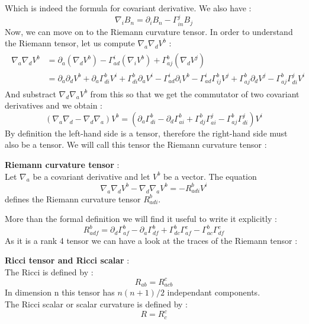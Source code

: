 \documentclass[a4paper,12pt]{article}
\theoremstyle{definition}
\begin{document}
Which is indeed the formula for covariant derivative.
We also have :
\begin{equation}
	\nabla_iB_n=\partial_iB_n-\Gamma^j_{in}B_j
\end{equation}
Now, we can move on to the Riemann curvature tensor.
In order to understand the Riemann tensor, let us compute $\nabla _a \nabla _d V^b$ :
\begin{align}
\begin{split}
	\nabla _a \nabla _d V^b &= \partial_a(\nabla _d V^b)-\Gamma^i_{ad} (\nabla _i V^b)+\Gamma^b_{aj} (\nabla _d V^j)\\
	&=\partial_a\partial_d V^b+ \partial_a \Gamma^b_{di}V^i+ \Gamma^b_{di}\partial_a V^i - \Gamma^i_{ad}\partial_i V^b
	-\Gamma^i_{ad}\Gamma^b_{ij}V^j+\Gamma^b_{aj}\partial_d V^j-\Gamma^b_{aj}\Gamma^j_{di}V^i
\end{split}
\end{align}
And substract $\nabla _d \nabla _a V^b$ from this so that we get the commutator of two covariant derivatives and we obtain :
\begin{equation}
	(\nabla _a \nabla _d - \nabla _d \nabla _a)V^b=(\partial_a \Gamma^b_{di}-\partial_d \Gamma^b_{ai}+\Gamma^b_{dj}\Gamma^j_{ai}-\Gamma^b_{aj}\Gamma^j_{di})V^i
\end{equation}
By definition the left-hand side is a tensor, therefore the right-hand side must also be a tensor.
We will call this tensor the Riemann curvature tensor :
\begin{definition}
	\textbf{Riemann curvature tensor} :\\
	Let $\nabla_a$ be a covariant derivative and let $V^b$ be a vector. The equation
	\begin{equation}
		\nabla _a \nabla _d V^b - \nabla _d \nabla _aV^b=-R_{adi}^b V^i
	\end{equation}
	defines the Riemann curvature tensor $R_{adi}^b$.
\end{definition}
More than the formal definition we will find it useful to write it explicitly :
\begin{equation} \label{Riemm}
	R_{adf}^b=\partial_d\Gamma^b_{af}-\partial_a\Gamma^b_{df}+\Gamma^b_{dc}\Gamma^c_{af}-\Gamma^b_{ac}\Gamma^c_{df}
\end{equation}
As it is a rank 4 tensor we can have a look at the traces of the Riemann tensor :
\begin{definition}
	\textbf{Ricci tensor and Ricci scalar} :\\
	The Ricci is defined by :
	\begin{equation}\label{Ricc}
		R_{ab}=R_{acb}^c
	\end{equation}
	In dimension n this tensor has $n(n+1)/2$ independant components.\\
	The Ricci scalar or scalar curvature is defined by :
	\begin{equation}
		R=R_c^c
	\end{equation}
\end{definition}
\end{document}
